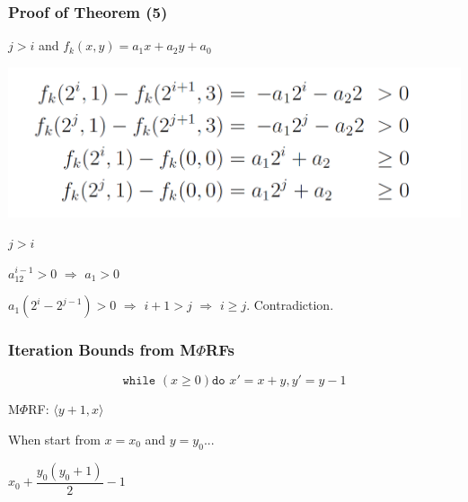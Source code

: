 \documentclass[11pt]{beamer}
\begin{document}
\begin{frame}\frametitle{Proof of Theorem (5)}
$j > i$ and $f_k(x, y) = a_1 x + a_2 y + a_0$
\begin{center}
\includegraphics[scale = 0.3]{9.PNG}
\end{center}
$j > i$

$a_12^{i - 1} > 0$ $\Rightarrow$ $a_1 > 0$

$a_1 (2^{i} - 2^{j - 1}) > 0$ $\Rightarrow$ $i + 1 > j$ $\Rightarrow$ $i \ge j$. Contradiction.




\end{frame}

\begin{frame}\frametitle{Iteration Bounds from M$\Phi$RFs}
\begin{example}
\[\texttt{while }(x \ge 0)\texttt{do } x'= x + y, y' = y - 1\]
\end{example}
M$\Phi$RF: $\langle y + 1, x \rangle $

When start from $x = x_0$ and $y = y_0$...

$x_0 + \dfrac{y_0(y_0 + 1)}{2} - 1$
\end{frame}
\end{document}
